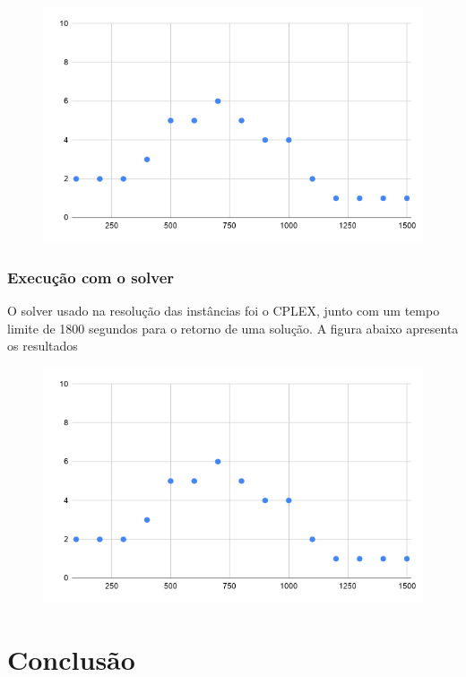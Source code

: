 \documentclass{article}
\begin{document}
\begin{figure}[H]
\centering
\includegraphics[scale=0.35]{placeholder}
\end{figure}


\subsubsection{Execução com o solver}
\quad O solver usado na resolução das instâncias foi o CPLEX, junto com um tempo limite de 1800 segundos  para o retorno de uma solução. A figura abaixo apresenta os resultados
\begin{figure}[H]
\centering
\includegraphics[scale=0.35]{placeholder}
\end{figure}


\section{Conclusão}
\end{document}
